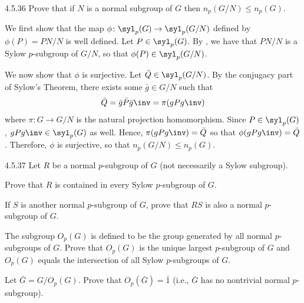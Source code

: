 \begin{exercise}{4.5.36}
	Prove that if $N$ is a normal subgroup of $G$ then $n_p(G/N) \leq n_p(G)$.
\end{exercise}

\begin{sol}
	We first show that the map $\phi \colon \syl_p(G) \to \syl_p(G/N)$ defined by $\phi(P) = PN/N$ is well defined.
	Let $P \in \syl_p(G)$.
	By , we have that $PN/N$ is a Sylow $p$-subgroup of $G/N$, so that $\phi(P) \in \syl_p(G/N)$.

	We now show that $\phi$ is surjective.
	Let $\bar Q \in \syl_p(G/N)$.
	By the conjugacy part of Sylow's Theorem, there exists some $\bar g \in G/N$ such that
	\[
		\bar Q = \bar g\bar P\bar g\inv = \pi(gPg\inv)
	\]
	where $\pi \colon G \to G/N$ is the natural projection homomorphism.
	Since $P \in \syl_p(G)$, $gPg\inv \in \syl_p(G)$ as well.
	Hence, $\pi(gPg\inv) = \bar Q$ so that $\phi(gPg\inv) = \bar Q$.
	Therefore, $\phi$ is surjective, so that $n_p(G/N) \leq n_p(G)$.
\end{sol}

\begin{exercise}{4.5.37}
	Let $R$ be a normal $p$-subgroup of $G$ (not necessarily a Sylow subgroup).
	\begin{subexercises}
		\item Prove that $R$ is contained in every Sylow $p$-subgroup of $G$.
		\item If $S$ is another normal $p$-subgroup of $G$, prove that $RS$ is also a normal $p$-subgroup of $G$.
		\item The subgroup $O_p(G)$ is defined to be the group generated by all normal $p$-subgroups of $G$.
		Prove that $O_p(G)$ is the unique largest $p$-subgroup of $G$ and $O_p(G)$ equals the intersection of all Sylow $p$-subgroups of $G$.
		\item Let $\bar G = G/O_p(G)$.
		Prove that $O_p(\bar G) = \bar 1$ (i.e., $\bar G$ has no nontrivial normal $p$-subgroup).
	\end{subexercises}
\end{exercise}

